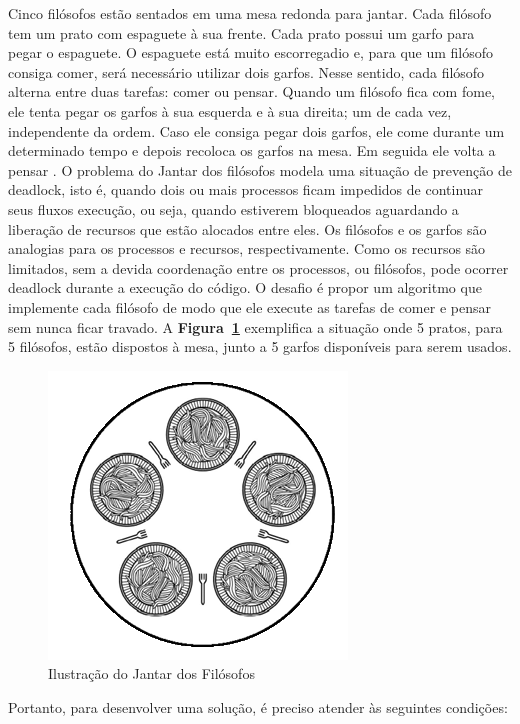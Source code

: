 \documentclass[
	12pt,				%
	openright,			%
	oneside,			%
	a4paper,			%
	chapter=TITLE,		%
	english,			%
	french,				%
	spanish,			%
	brazil				%
	]{abntex2}
\theoremstyle{definition}
\begin{document}
Cinco filósofos estão sentados em uma mesa redonda para jantar. Cada filósofo tem um prato com espaguete à sua frente. Cada prato possui um garfo para pegar o espaguete. O espaguete está muito escorregadio e, para que um filósofo consiga comer, será necessário utilizar dois garfos. Nesse sentido, cada filósofo alterna entre duas tarefas: comer ou pensar. Quando um filósofo fica com fome, ele tenta pegar os garfos à sua esquerda e à sua direita; um de cada vez, independente da ordem. Caso ele consiga pegar dois garfos, ele come durante um determinado tempo e depois recoloca os garfos na mesa. Em seguida ele volta a pensar \cite{jantar-filosofos}. O problema do Jantar dos filósofos modela uma situação de prevenção de deadlock, isto é, quando dois ou mais processos ficam impedidos de continuar seus fluxos execução, ou seja, quando estiverem bloqueados aguardando a liberação de recursos que estão alocados entre eles. Os filósofos e os garfos são analogias para os processos e recursos, respectivamente. Como os recursos são limitados, sem a devida coordenação entre os processos, ou filósofos, pode ocorrer deadlock durante a execução do código. O desafio é propor um algoritmo que implemente cada filósofo de modo que ele execute as tarefas de comer e pensar sem nunca ficar travado. A \textbf{Figura~\ref{fig:jantar_exemplo}} exemplifica a situação onde 5 pratos, para 5 filósofos, estão dispostos à mesa, junto a 5 garfos disponíveis para serem usados.

\begin{figure}
    \centering
    \includegraphics{imagens/jantar.png}
    \caption{Ilustração do Jantar dos Filósofos}
    \label{fig:jantar_exemplo}
\end{figure}

Portanto, para desenvolver uma solução, é preciso atender às seguintes condições:
\end{document}
